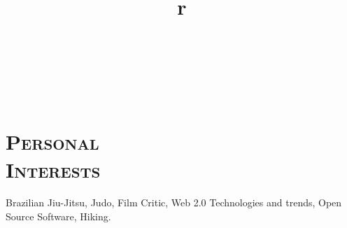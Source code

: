 \begin{resume}
{}



\begin{formatb}
  \title{r}\\
  \\
 \body\\
\end{formatb}





\section{\textsc{Personal\\ Interests}}
\employer{}
\title{}
\location{} 
\dates{}
Brazilian Jiu-Jitsu, Judo, Film Critic, Web 2.0 Technologies and trends, Open Source Software, Hiking.


\end{resume}
